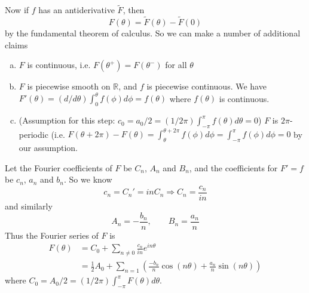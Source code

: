 Now if $f$ has an antiderivative $\widetilde{F}$, then 
\begin{equation}
F(\theta) = \widetilde{F}(\theta) - \widetilde{F}(0)
\end{equation}
by the fundamental theorem of calculus. So we can make a
number of additional claims\begin{enumerate}[a)]
\item $F$ is continuous, i.e. $F(\theta^{+})=F(\theta^{-})$
  for all $\theta$
\item $F$ is piecewise smooth on $\mathbb{R}$, and $f$ is
  piecewise continuous. We have
  $F'(\theta)=(d/d\theta)\int^{\theta}_{0}f(\phi)d\phi=f(\theta)$
  where $f(\theta)$ is continuous.
\item (Assumption for this step:
  $c_{0}=a_{0}/2=(1/2\pi)\int^{\pi}_{-\pi}f(\theta)d\theta=0$)
  $F$ is $2\pi$-periodic
  (i.e. $F(\theta+2\pi)-F(\theta)=\int^{\theta+2\pi}_{\theta}f(\phi)d\phi=\int^{\pi}_{-\pi}f(\phi)d\phi=0$
  by our assumption. 
\end{enumerate}
Let the Fourier coefficients of $F$ be $C_n$, $A_n$ and
$B_n$, and the coefficients for $F'=f$ be $c_n$, $a_n$ and
$b_n$. So we know
\begin{equation}
c_{n}=C_{n}' = inC_{n}\Rightarrow C_{n}=\frac{c_n}{in}
\end{equation}
and similarly
\begin{equation}
A_{n} = -\frac{b_n}{n},\qquad B_n=\frac{a_n}{n}
\end{equation}
Thus the Fourier series of $F$ is
\begin{subequations}
\begin{align}
F(\theta) &= C_{0} +
\sum_{n\neq0}\frac{c_n}{in}e^{in\theta}\\
&=\frac{1}{2}A_{0} + \sum_{n=1}\left(\frac{-b_n}{n}\cos(n\theta)+\frac{a_n}{n}\sin(n\theta)\right)
\end{align}
\end{subequations}
where $C_0=A_0/2=(1/2\pi)\int^{\pi}_{-\pi}F(\theta)d\theta$.

